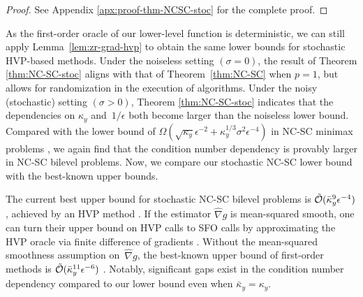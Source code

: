 \documentclass{article}
\begin{document}
\begin{proof}
See Appendix \ref{apx:proof-thm-NCSC-stoc} for the complete proof.
\end{proof}

As the first-order oracle of our lower-level function is deterministic, we can still apply Lemma~\ref{lem:zr-grad-hvp} to obtain the same lower bounds for stochastic HVP-based methods.
Under the noiseless setting $(\sigma=0)$, the result of Theorem \ref{thm:NC-SC-stoc} 
aligns with that of Theorem~\ref{thm:NC-SC} when $p=1$, but allows for randomization in the execution of algorithms. Under the noisy (stochastic) setting $(\sigma>0)$, Theorem \ref{thm:NC-SC-stoc} indicates that the dependencies on $\kappa_y$ and~$1/\epsilon$ both become larger than the noiseless lower bound. Compared with the lower bound of $ \Omega(\sqrt{\kappa_y} \epsilon^{-2} + \kappa_y^{1/3} \sigma^2 \epsilon^{-4} ) $ in NC-SC minimax problems \citep{li2021complexity}, we again find that the condition number dependency is provably larger in NC-SC bilevel problems. Now, we compare our stochastic NC-SC lower bound with the best-known upper bounds.

\begin{remark} The current best upper bound for stochastic NC-SC bilevel problems is $\tilde {{\mathcal{O}}}(\bar \kappa_y^9 \epsilon^{-4})$, achieved by an HVP method  \citep{ji2021bilevel}. 
If the estimator $\hat \nabla g$ is mean-squared smooth, one can turn their upper bound on HVP calls to SFO calls by approximating the HVP oracle via finite difference of gradients \citep{yang2023achieving}. Without the mean-squared smoothness assumption on~$\hat \nabla g$, the best-known upper bound of first-order methods is $\tilde {{\mathcal{O}}}(\bar \kappa_y^{11} \epsilon^{-6})$ \citep{kwon2024complexity,chen2023near}. Notably, significant gaps exist in the condition number dependency compared to our lower bound even when $\bar \kappa_y = \kappa_y$.
\end{remark}

\end{document}
